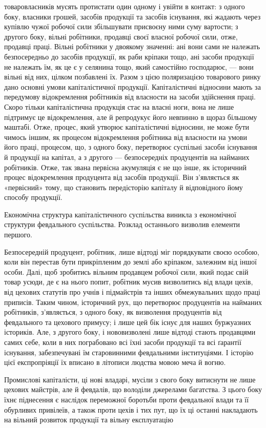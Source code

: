 \parcont{}  %
товаровласників мусять протистати один одному і увійти в контакт:
з одного боку, власники грошей, засобів продукції та засобів
існування, які жадають через купівлю чужої робочої сили
збільшувати присвоєну ними суму вартости; з другого боку,
вільні робітники, продавці своєї власної робочої сили, отже, продавці
праці. Вільні робітники у двоякому значенні: ані вони
сами не належать безпосередньо до засобів продукції, як раби
кріпаки тощо, ані засоби продукції не належать їм, як це є у
селянина тощо, який самостійно господарює, — вони вільні від
них, цілком позбавлені їх. Разом з цією поляризацією товарового
ринку дано основні умови капіталістичної продукції. Капіталістичні
відносини мають за передумову відокремлення робітників
від власности на засоби здійснення праці. Скоро тільки
капіталістична продукція стає на власні ноги, вона не лише
підтримує це відокремлення, але й репродукує його невпинно
в щораз більшому маштабі. Отже, процес, який утворює капіталістичні
відносини, не може бути чимось іншим, як процесом
відокремлення робітника від власности на умови його праці,
процесом, що, з одного боку, перетворює суспільні засоби існування
й продукції на капітал, а з другого — безпосередніх продуцентів
на найманих робітників. Отже, так звана первісна
акумуляція є не що інше, як історичний процес відокремлення
продуцента від засобів продукції. Він з’являється як «первісний»
тому, що становить передісторію капіталу й відповідного
йому способу продукції.

Економічна структура капіталістичного суспільства виникла
з економічної структури февдального суспільства. Розклад
останнього визволив елементи першого.

Безпосередній продуцент, робітник, лише відтоді міг порядкувати
своєю особою, коли він перестав бути прикріпленим до
землі або кріпаком, залежним від іншої особи. Далі, щоб зробитись
вільним продавцем робочої сили, який подає свій товар
усюди, де є на нього попит, робітник мусив визволитись від влади
цехів, від цехових статутів про учнів і підмайстрів та інших
обмежувальних щодо праці приписів. Таким чином, історичний
рух, що перетворює продуцентів на найманих робітників, з’являється,
з одного боку, як визволення продуцентів від февдального
та цехового примусу; і лише цей бік існує для наших буржуазних
істориків. Але, з другого боку, і нововизволені лише
відтоді стають продавцями самих себе, коли в них пограбовано
всі їхні засоби продукції та всі ґарантії існування, забезпечувані
їм старовинними февдальними інституціями. І історію цієї
експропріяції їх вписано в літописи людства мовою меча й вогню.

Промислові капіталісти, ці нові владарі, мусіли з свого боку
витиснути не лише цехових майстрів, але й февдалів, що володіли
джерелами багатства. З цього боку їхнє піднесення є наслідок
переможної боротьби проти февдальної влади та її обурливих
привілеїв, а також проти цехів і тих пут, що їх ці останні накладають
на вільний розвиток продукції та вільну експлуатацію
\parbreak{}  %
